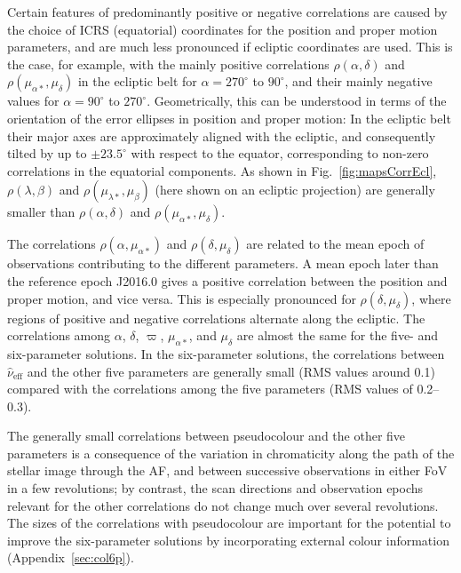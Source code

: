 \documentclass[longauth]{aa} %
\begin{document}
Certain features of predominantly positive or negative correlations are caused by
the choice of ICRS (equatorial) coordinates for the position and proper motion 
parameters, and are much less pronounced if ecliptic coordinates are used. This 
is the case, for example, with the mainly positive correlations $\rho(\alpha,\delta)$
and $\rho(\mu_{\alpha*},\mu_\delta)$ in the ecliptic belt for $\alpha=270^\circ$ to 
$90^\circ$, and their mainly negative values for $\alpha=90^\circ$ to $270^\circ$.
Geometrically, this can be understood in terms of the orientation of the error ellipses
in position and proper motion: In the ecliptic belt their major axes are approximately 
aligned with the ecliptic, and consequently tilted by up to $\pm 23.5^\circ$ with 
respect to the equator, corresponding to non-zero correlations in the equatorial
components. As shown in Fig.~\ref{fig:mapsCorrEcl}, $\rho(\lambda,\beta)$ and 
$\rho(\mu_{\lambda*},\mu_\beta)$ (here shown on an ecliptic projection) are generally
smaller than $\rho(\alpha,\delta)$ and $\rho(\mu_{\alpha*},\mu_\delta)$. 

The correlations $\rho(\alpha,\mu_{\alpha*})$ and $\rho(\delta,\mu_\delta)$ are 
related to the mean epoch of observations contributing to the different parameters. 
A mean epoch later than the reference epoch J2016.0 gives 
a positive correlation between the position and proper motion, and vice versa. 
This is especially pronounced for $\rho(\delta,\mu_\delta)$, where regions of positive 
and negative correlations alternate along the ecliptic.   
The correlations among $\alpha$, $\delta$, $\varpi$, $\mu_{\alpha*}$, and $\mu_\delta$
are almost the same for the five- and six-parameter solutions. In the six-parameter
solutions, the correlations between $\hat{\nu}_\text{eff}$ and the other five parameters are 
generally small (RMS values around 0.1) compared with the correlations among the five
parameters (RMS values of 0.2--0.3). 

The generally small correlations between pseudocolour and the other five parameters
is a consequence of the variation in chromaticity along the path of the stellar image 
through the AF, and between successive observations in either FoV
in a few revolutions; by contrast, the scan directions and observation epochs relevant 
for the other correlations do not change much over several revolutions. The sizes of the 
correlations with pseudocolour are important for the potential to improve the six-parameter 
solutions by incorporating external colour information (Appendix~\ref{sec:col6p}).
\end{document}
